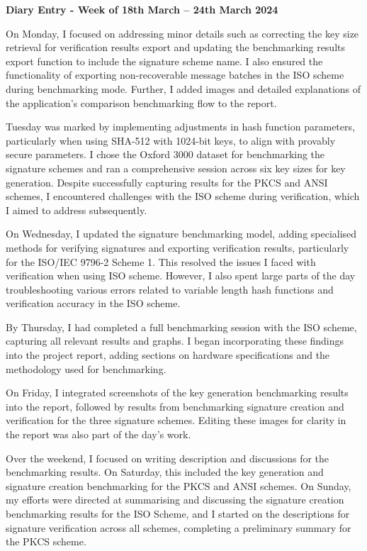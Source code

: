 \documentclass[]{final_report}
\theoremstyle{definition}
\begin{document}
\textbf{Diary Entry - Week of 18th March – 24th March 2024}

On Monday, I focused on addressing minor details such as correcting the key size retrieval for verification
results export and updating the benchmarking results export function to include the signature scheme name. I also
ensured the functionality of exporting non-recoverable message batches in the ISO scheme during benchmarking mode.
Further, I added images and detailed explanations of the application’s comparison benchmarking flow to the report.

Tuesday was marked by implementing adjustments in hash function parameters, particularly when using SHA-512 with
1024-bit keys, to align with provably secure parameters. I chose the Oxford 3000 dataset for benchmarking the signature
schemes and ran a comprehensive session across six key sizes for key generation. Despite successfully capturing results
for the PKCS and ANSI schemes, I encountered challenges with the ISO scheme during verification, which I aimed to
address subsequently.

On Wednesday, I updated the signature benchmarking model, adding specialised methods for verifying signatures and
exporting verification results, particularly for the ISO/IEC 9796-2 Scheme 1. This resolved the issues I faced with verification when using ISO scheme. However, I also spent large parts of the day troubleshooting various errors related to variable length hash
functions and verification accuracy in the ISO scheme.

By Thursday, I had completed a full benchmarking session with the ISO scheme, capturing all relevant results and graphs.
I began incorporating these findings into the project report, adding sections on hardware specifications and the
methodology used for benchmarking.

On Friday, I integrated screenshots of the key generation benchmarking results into the report, followed by results from
benchmarking signature creation and verification for the three signature schemes. Editing these images for clarity in
the report was also part of the day’s work.

Over the weekend, I focused on writing description and discussions for the benchmarking results. On Saturday,
this included the key generation and signature creation benchmarking for the PKCS and ANSI schemes. On Sunday, my
efforts were directed at summarising and discussing the signature creation benchmarking results for the ISO Scheme, and
I started on the descriptions for signature verification across all schemes, completing a preliminary summary for the
PKCS scheme.
\end{document}
